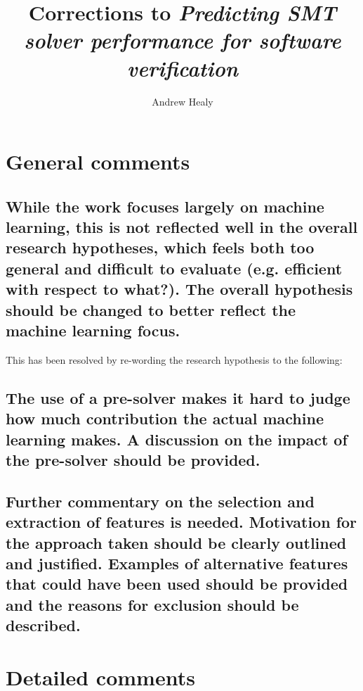 \documentclass[]{report}
\title{Corrections to \emph{Predicting SMT solver performance for software verification}}
\author{Andrew Healy}
\begin{document}
\maketitle

\section[1]{General comments}

\subsection*{While the work focuses largely on machine learning, this is not reflected well in the overall research hypotheses, which feels both too general and difficult to evaluate (e.g. efficient with respect to what?). The overall hypothesis should be changed to better reflect the machine learning focus.}
 
This has been resolved by re-wording the research hypothesis to the following:  
 
 
\subsection*{The use of a pre-solver makes it hard to judge how much contribution the actual machine learning makes. A discussion on the impact of the pre-solver should be provided.}
	
\subsection*{Further commentary on the selection and extraction of features is needed. Motivation for the approach taken should be clearly outlined and justified. Examples of alternative features that could have been used should be provided and the reasons for exclusion should be described.}

\section[2]{Detailed comments}
\end{document}
